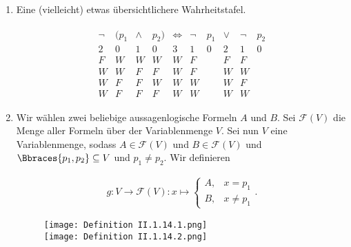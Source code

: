 
\begin{solution}

\phantom{}

\begin{enumerate}[label = \alph*.]

    \item Eine (vielleicht) etwas übersichtlichere Wahrheitstafel.

    \begin{align*}
        \begin{array}{cccccccccc}
            \neg & (p_1 & \land & p_2) & \iff & \neg & p_1 & \lor & \neg & p_2 \\
            \hline
            2 & 0 & 1 & 0 & 3 & 1 & 0 & 2 & 1 & 0 \\
            \hline
            F & W & W & W & W & F & & F & F & \\
            W & W & F & F & W & F & & W & W & \\
            W & F & F & W & W & W & & W & F & \\
            W & F & F & F & W & W & & W & W &
        \end{array}
    \end{align*}

    \item Wir wählen zwei beliebige aussagenlogische Formeln $A$ und $B$.
    Sei $\mathcal{F}(V)$ die Menge aller Formeln über der Variablenmenge $V$.
    Sei nun $V$ eine Variablenmenge, sodass $A \in \mathcal{F}(V)$ und $B \in \mathcal{F}(V)$ und $\Bbraces{p_1, p_2} \subseteq V$ und $p_1 \neq p_2$.
    Wir definieren

    \begin{align*}
        g:
        V \to \mathcal{F}(V):
        x \mapsto
        \begin{cases}
            A, & x = p_1 \\
            B, & x \neq p_1
        \end{cases}.
    \end{align*}
    

    \begin{figure}[h!]
        \begin{boxedin}
            \begin{center}
                \texttt{[image: Definition II.1.14.1.png]} \\
                \texttt{[image: Definition II.1.14.2.png]}
            \end{center}
        \end{boxedin}
    \end{figure}


\end{enumerate}
\end{solution}
